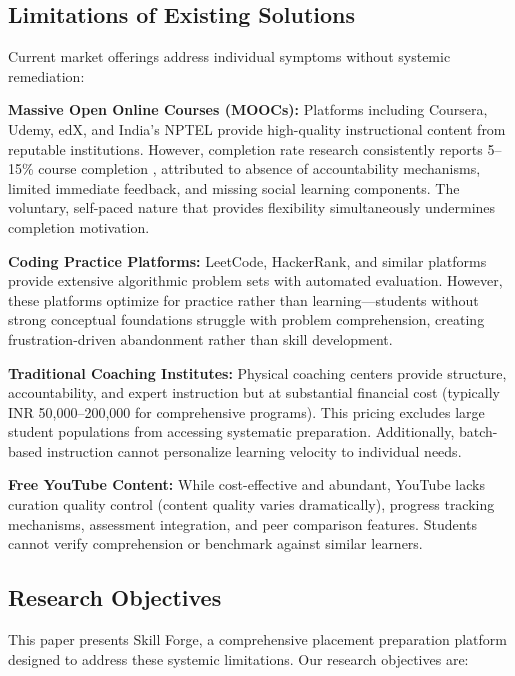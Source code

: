 \documentclass[journal]{IEEEtran}
\begin{document}
\subsection{Limitations of Existing Solutions}

Current market offerings address individual symptoms without systemic remediation:

\textbf{Massive Open Online Courses (MOOCs):} Platforms including Coursera, Udemy, edX, and India's NPTEL provide high-quality instructional content from reputable institutions. However, completion rate research consistently reports 5--15\% course completion \cite{jordan2015}, attributed to absence of accountability mechanisms, limited immediate feedback, and missing social learning components. The voluntary, self-paced nature that provides flexibility simultaneously undermines completion motivation.

\textbf{Coding Practice Platforms:} LeetCode, HackerRank, and similar platforms provide extensive algorithmic problem sets with automated evaluation. However, these platforms optimize for practice rather than learning---students without strong conceptual foundations struggle with problem comprehension, creating frustration-driven abandonment rather than skill development.

\textbf{Traditional Coaching Institutes:} Physical coaching centers provide structure, accountability, and expert instruction but at substantial financial cost (typically INR 50,000--200,000 for comprehensive programs). This pricing excludes large student populations from accessing systematic preparation. Additionally, batch-based instruction cannot personalize learning velocity to individual needs.

\textbf{Free YouTube Content:} While cost-effective and abundant, YouTube lacks curation quality control (content quality varies dramatically), progress tracking mechanisms, assessment integration, and peer comparison features. Students cannot verify comprehension or benchmark against similar learners.

\subsection{Research Objectives}

This paper presents Skill Forge, a comprehensive placement preparation platform designed to address these systemic limitations. Our research objectives are:
\end{document}
